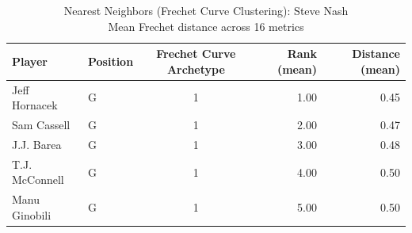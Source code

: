 \begin{table}[t]
\caption*{
{\fontsize{20}{25} Nearest Neighbors (Frechet Curve Clustering): Steve Nash\fontsize{12}{15}\selectfont } \\ 
{\fontsize{14}{17}\selectfont  Mean Frechet distance across 16 metrics\fontsize{12}{15}\selectfont }
} 
\fontsize{12.0pt}{14.0pt}\selectfont
\begin{tabular*}{\linewidth}{@{\extracolsep{\fill}}llcrr}
\toprule
Player & Position & Frechet Curve Archetype & Rank (mean) & Distance (mean) \\ 
\midrule\addlinespace[2.5pt]
Jeff Hornacek & G & 1 & 1.00 & 0.45 \\ 
Sam Cassell & G & 1 & 2.00 & 0.47 \\ 
J.J. Barea & G & 1 & 3.00 & 0.48 \\ 
T.J. McConnell & G & 1 & 4.00 & 0.50 \\ 
Manu Ginobili & G & 1 & 5.00 & 0.50 \\ 
\bottomrule
\end{tabular*}
\end{table}

